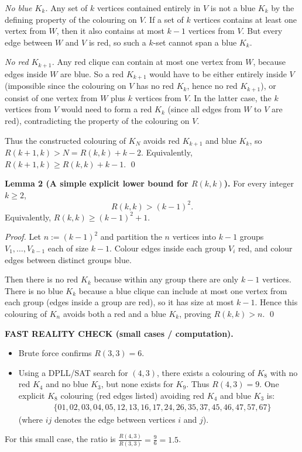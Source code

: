 \emph{No blue $K_k$.}
Any set of $k$ vertices contained entirely in $V$ is not a blue $K_k$ by the defining property of the colouring on $V$.
If a set of $k$ vertices contains at least one vertex from $W$, then it also contains at most $k-1$ vertices from $V$.
But every edge between $W$ and $V$ is red, so such a $k$-set cannot span a blue $K_k$.

\emph{No red $K_{k+1}$.}
Any red clique can contain at most one vertex from $W$, because edges inside $W$ are blue.
So a red $K_{k+1}$ would have to be either entirely inside $V$ (impossible since the colouring on $V$ has no red $K_k$, hence no red $K_{k+1}$),
or consist of one vertex from $W$ plus $k$ vertices from $V$.
In the latter case, the $k$ vertices from $V$ would need to form a red $K_k$ (since all edges from $W$ to $V$ are red), contradicting the property of the colouring on $V$.

Thus the constructed colouring of $K_N$ avoids red $K_{k+1}$ and blue $K_k$, so $R(k+1,k) > N = R(k,k)+k-2$.
Equivalently, $R(k+1,k)\ge R(k,k)+k-1$.
\qed

\medskip
\textbf{Lemma 2 (A simple explicit lower bound for $R(k,k)$).}
For every integer $k\ge 2$,
\[
R(k,k) > (k-1)^2.
\]
Equivalently, $R(k,k)\ge (k-1)^2+1$.

\emph{Proof.}
Let $n:=(k-1)^2$ and partition the $n$ vertices into $k-1$ groups $V_1,\dots,V_{k-1}$ each of size $k-1$.
Colour edges inside each group $V_i$ red, and colour edges between distinct groups blue.

Then there is no red $K_k$ because within any group there are only $k-1$ vertices.
There is no blue $K_k$ because a blue clique can include at most one vertex from each group (edges inside a group are red), so it has size at most $k-1$.
Hence this colouring of $K_n$ avoids both a red and a blue $K_k$, proving $R(k,k)>n$.
\qed

\medskip
\textbf{FAST REALITY CHECK (small cases / computation).}
\begin{itemize}
\item Brute force confirms $R(3,3)=6$.
\item Using a DPLL/SAT search for $(4,3)$, there exists a colouring of $K_8$ with no red $K_4$ and no blue $K_3$, but none exists for $K_9$.
Thus $R(4,3)=9$.
One explicit $K_8$ colouring (red edges listed) avoiding red $K_4$ and blue $K_3$ is:
\[\begin{aligned}
&\{01,02,03,04,05,12,13,16,17,24,26,35,37,45,46,47,57,67\}
\end{aligned}\]
(where $ij$ denotes the edge between vertices $i$ and $j$).
\end{itemize}
For this small case, the ratio is $\frac{R(4,3)}{R(3,3)}=\frac{9}{6}=1.5$.

